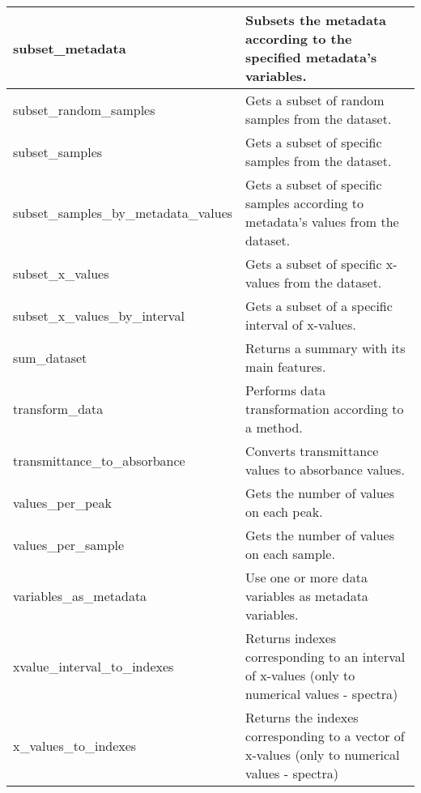 \begin{scriptsize}
\begin{longtable}{|m{4.3cm}|m{11cm}|}
		\hline
		subset\_metadata & Subsets the metadata according to the specified metadata's variables. \\
		
		\hline
		subset\_random\_samples & Gets a subset of random samples from the dataset. \\
		
		\hline
		subset\_samples & Gets a subset of specific samples from the dataset. \\
		
		\hline
		subset\_samples\_by\_metadata\_values & Gets a subset of specific samples according to metadata’s values from the dataset. \\
		
		\hline
		subset\_x\_values & Gets a subset of specific x-values from the dataset. \\
		
		\hline
		subset\_x\_values\_by\_interval & Gets a subset of a specific interval of x-values. \\
		
		\hline
		sum\_dataset & Returns a summary with its main features. \\
		
		\hline
		transform\_data & Performs data transformation according to a method. \\
		
		\hline
		transmittance\_to\_absorbance & Converts transmittance values to absorbance values. \\
		
		\hline
		values\_per\_peak & Gets the number of values on each peak. \\
		
		\hline
		values\_per\_sample & Gets the number of values on each sample. \\
		
		\hline
		variables\_as\_metadata & Use one or more data variables as metadata variables. \\
		
		\hline
		xvalue\_interval\_to\_indexes & Returns indexes corresponding to an interval of x-values (only to numerical values - spectra) \\
		
		\hline
		x\_values\_to\_indexes & Returns the indexes corresponding to a vector of x-values (only to numerical values - spectra) \\
		
		\hline
		
	\end{longtable}
\end{scriptsize}


